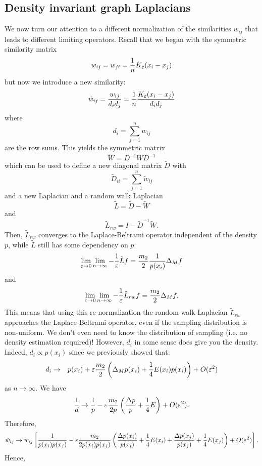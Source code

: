 \subsection{Density invariant graph Laplacians}
We now turn our attention to a different normalization of the similarities $w_{ij}$ that leads to different limiting operators.
Recall that we began with the symmetric similarity matrix $$w_{ij} = w_{ji} = \frac{1}{n}K_{\varepsilon}(x_i-x_j)$$ but now we introduce a new similarity:
\[
\tilde{w}_{ij} = \frac{w_{ij}}{d_i d_j} = \frac{1}{n}\frac{K_{\varepsilon}(x_i-x_j)}{d_i d_j}
\]
where $$d_i = \sum_{j=1}^n w_{ij}$$ are the row sums.
This yields the symmetric matrix
\[
\tilde{{W}} = {D}^{-1} {W} {D}^{-1}
\]
which can be used to define a new diagonal matrix $\tilde{D}$ with
\[
\tilde{D}_{ii} = \sum_{j=1}^n \tilde{w}_{ij}
\]
and a new Laplacian and a random walk Laplacian
$$\tilde{L} = \tilde{D} - \tilde{W}$$
and
$$\tilde{L}_{rw} = I - \tilde{D}^{-1}\tilde{W}.$$
Then, $\tilde{L}_{rw}$ converges to the Laplace-Beltrami operator independent of the density $p$, while $\tilde{L}$ still has some dependency on $p$:
$$\lim_{\varepsilon\to 0}\lim_{n\to \infty} -\frac{1}{\varepsilon}\tilde{L}f = \frac{m_2}{2} \frac{1}{p(x_i)}\Delta_M f$$
and
$$\lim_{\varepsilon\to 0}\lim_{n\to \infty} -\frac{1}{\varepsilon}\tilde{L}_{rw}f = \frac{m_2}{2} \Delta_M f.$$
This means that using this re-normalization the random walk Laplacian $\tilde{L}_{rw}$ approaches the Laplace-Beltrami operator, even if the sampling distribution is non-uniform.
We don't even need to know the distribution of sampling (i.e. no density estimation required)!
However, $d_i$ in some sense does give you the density.
Indeed, $d_i \propto p(x_i)$ since we previously showed that:
\begin{eqnarray}
d_i &\to& p(x_i) + \varepsilon \frac{m_2}{2}\left(\Delta_M p(x_i) + \frac{1}{4}E(x_i)p(x_i)\right) + O(\varepsilon^2)
\end{eqnarray}
as $n\to \infty$. We have
$$\frac{1}{d} \to \frac{1}{p} - \varepsilon\frac{m_2}{2p}\left(\frac{\Delta p}{p} + \frac{1}{4}E \right) + O(\varepsilon^2).$$
Therefore,
$$\tilde{w}_{ij} \to w_{ij}\left[\frac{1}{p(x_i)p(x_j)} - \varepsilon\frac{m_2}{2p(x_i)p(x_j)}\left(\frac{\Delta p(x_i)}{p(x_i)} + \frac{1}{4}E(x_i) + \frac{\Delta p(x_j)}{p(x_j)} + \frac{1}{4}E(x_j)\right) + O(\varepsilon^2) \right].$$
Hence,
